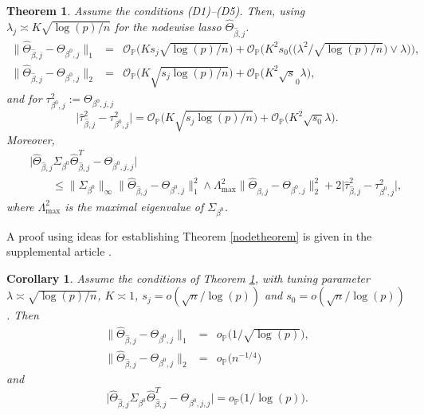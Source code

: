 \documentclass[aos,MSNbibl,dvips]{arximspdf}
\newtheorem{theo}{Theorem}[section]
\newtheorem{corr}{Corollary}[section]
\newcommand{\PP}{\mathbb{P}}
\begin{document}
\begin{theo} \label{node2theorem} Assume the conditions \textup{(D1)--(D5)}.
Then, using $\lambda_j \asymp  K \sqrt{\log(p)/ n }$ for
the nodewise
lasso $\hat{\Theta}_{\hat{\beta}, j }$.
%
\begin{eqnarray*}
\| \hat\Theta_{\hat\beta, j} - \Theta_{\beta^0, j } \|_1 &=& {
\mathcal O}_{\PP} \bigl( K s_j \sqrt{\log(p)/ n } \bigr) + {
\mathcal O}_{\PP} \bigl( K^2 s_0 \bigl(\bigl(
\lambda^2 / \sqrt{\log(p)/ n } \bigr) \vee\lambda\bigr) \bigr),
%
\\
\| \hat\Theta_{\hat\beta, j} - \Theta_{\beta^0, j } \|_2& =& {
\mathcal O}_{\PP} \bigl( K \sqrt{s_j \log(p)/ n } \bigr) + {
\mathcal O}_{\PP} \bigl( K^2 \sqrt s_0 \lambda
\bigr), %
\end{eqnarray*}
%
and for $\tau_{\beta^0, j}^2:= \Theta_{\beta^0, j,j } $
%
\[
\bigl| \hat\tau_{\hat\beta, j}^2 - \tau_{\beta^0, j}^2 \bigr|
= {\mathcal O}_{\PP} \bigl( K \sqrt{s_j \log(p)/ n } \bigr)
+ {\mathcal O}_{\PP} \bigl(K^2 \sqrt{s_0}
\lambda \bigr). %
\]
%
Moreover,
%
\begin{eqnarray*}
&&\bigl| \hat{\Theta}_{\hat{\beta},j} \Sigma_{\beta^0} \hat{\Theta
}_{\hat{\beta
},j}^T - \Theta_{\beta^0,j,j}\bigr | %
\\
&&\qquad\le\| \Sigma_{\beta^0} \|_{\infty} \| \hat{\Theta}_{\hat{\beta},j} -
\Theta_{\beta^0, j} \|_1^2 \wedge
\Lambda_\mathrm{max}^2 \| \hat{\Theta}_{\hat{\beta},j} - \Theta
_{\beta^0,
j} \|_2^2 + 2 \bigl| \hat\tau_{\hat\beta, j}^2
- \tau_{\beta^0, j}^2 \bigr|, %
\end{eqnarray*}
%
where $\Lambda_\mathrm{max}^2$ is the maximal eigenvalue of $\Sigma
_{\beta
^0} $.
\end{theo}

A proof using ideas for establishing Theorem \ref{nodetheorem} is given
in the supplemental article \cite{supplement}.

\begin{corr} \label{node2corollary} Assume the conditions of Theorem
\ref{node2theorem},
with tuning parameter $\lambda\asymp\sqrt{\log(p)/ n}$, $K \asymp1$,
$s_j = o ( \sqrt n / \log(p)) $ and $s_0= o (\sqrt n / \log(p)) $.
Then
%
\begin{eqnarray*}
\| \hat\Theta_{\hat\beta, j} - \Theta_{\beta^0, j } \|_1 &=&
{o}_{\PP} \bigl( 1/ \sqrt{\log(p)} \bigr), %
\\
\| \hat\Theta_{\hat\beta, j} - \Theta_{\beta^0, j } \|_2 &=&
o_{\PP} \bigl(n^{-1/4}\bigr)
\end{eqnarray*}
%
and
%
\[
\bigl| \hat{\Theta}_{\hat{\beta},j} \Sigma_{\beta^0} \hat{\Theta
}_{\hat{\beta
},j}^T - \Theta_{\beta^0, j,j}\bigr | = o_{\PP}
\bigl( 1/ \log (p) \bigr). %
\]
%
\end{corr}
\end{document}
